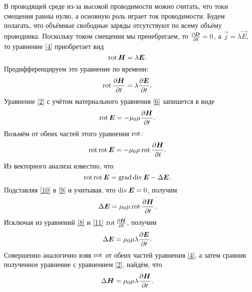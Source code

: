 В проводящей среде из-за высокой проводимости можно считать, что токи
смещения равны нулю, а основную роль играет ток проводимости. Будем полагать, что объёмные свободные заряды отсутствуют
по всему объёму проводника. Поскольку током смещения мы пренебрегаем, то $\frac{\partial {\boldsymbol{D}}}{\partial t}=0$, а $\vec{j}=\lambda\vec{E}$, то уравнение
\eqref{4} приобретает вид
\[
\mathop{\mathrm{rot}}{\boldsymbol{H}}=\lambda{\boldsymbol{E}}.
\]
Продифференцируем это уравнение по времени:
\begin{equation} \eqmark{8}
\Rot\ddt{\vec{H}}=\lambda\ddt{\vec{E}}.
\end{equation}
Уравнение \eqref{2} с учётом материального уравнения \eqref{6} запишется в виде
\[
\mathop{\mathrm{rot}}{\boldsymbol{E}}=-\mu_0\mu\frac{\partial {\boldsymbol{H}}}{\partial t}.
\]
Возьмём от обеих частей этого уравнения $\mathop{\mathrm{rot}}$:
\begin{equation} \eqmark{9}
\Rot\Rot\vec{E}=-\mu_0\mu\Rot\ddt{\vec{H}}.
\end{equation}
Из векторного анализа известно, что
\begin{equation} \eqmark{10}
\Rot\Rot\vec{E}=\Grad\Div\vec{E}-\Delta\vec{E}.
\end{equation}
Подставляя \eqref{10} в \eqref{9} и учитывая, что $\mathop{\mathrm{div}}{\boldsymbol{E}}=0$, получим
\begin{equation} \eqmark{11}
\Delta\vec{E}=\mu_0\mu\Rot\ddt{\vec{H}}.
\end{equation}
Исключая из уравнений \eqref{8} и \eqref{11} $\mathop{\mathrm{rot}}\frac{\partial {\boldsymbol{H}}}{\partial t}$, получим
\begin{equation} \eqmark{12}
\Delta\vec{E}=\mu_0\mu\lambda\ddt{\vec{E}}.
\end{equation}
Совершенно аналогично взяв $\mathop{\mathrm{rot}}$ от обеих частей уравнения \eqref{4}, а затем сравнив полученное уравнение с уравнением
\eqref{2}, найдём, что
\begin{equation} \eqmark{13}
\Delta\vec{H}=\mu_0\mu\lambda\ddt{\vec{H}}.
\end{equation}





